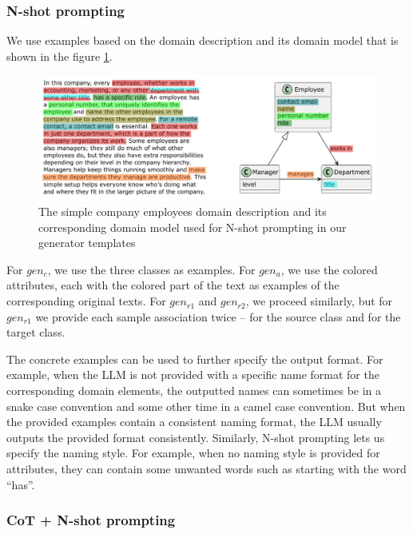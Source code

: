 \subsubsection{N-shot prompting}

We use examples based on the domain description and its domain model that is shown in the figure \ref{fig:prompting-domain}.

\begin{figure}[!h]
    \centering
    \includegraphics[scale=0.6]{img/prompting-domain.pdf}
    \caption{\centering The simple company employees domain description and its corresponding domain model used for N-shot prompting in our generator templates}
    \label{fig:prompting-domain}
\end{figure}


For $gen_c$, we use the three classes as examples. For $gen_a$, we use the colored attributes, each with the colored part of the text as examples of the corresponding original texts. For $gen_{r1}$ and ${gen_{r2}}$, we proceed similarly, but for ${gen_{r1}}$ we provide each sample association twice – for the source class and for the target class.

The concrete examples can be used to further specify the output format. For example, when the LLM is not provided with a specific name format for the corresponding domain elements, the outputted names can sometimes be in a snake case convention and some other time in a camel case convention. But when the provided examples contain a consistent naming format, the LLM usually outputs the provided format consistently. Similarly, N-shot prompting lets us specify the naming style. For example, when no naming style is provided for attributes, they can contain some unwanted words such as starting with the word ``has''.


\subsubsection{CoT + N-shot prompting}

